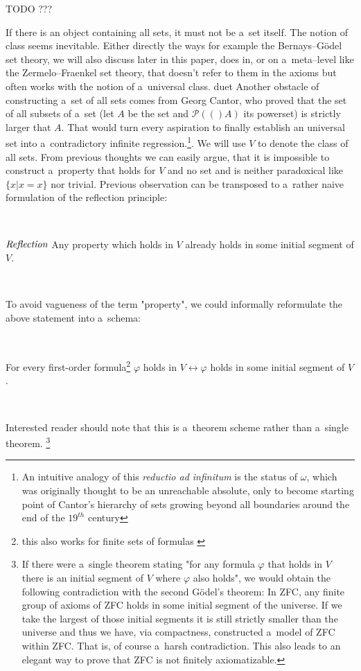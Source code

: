 \documentclass[12pt,a4paper]{article}
\newcommand{\power}[1]{\ensuremath{\mathscr{P}} (#1)}
\renewcommand{\iff}{\leftrightarrow}
\begin{document}
TODO ???

If there is an object containing all sets, it must not be a~set itself. The notion of class seems inevitable. Either directly the ways for example the Bernays–Gödel set theory, we will also discuss later in this paper, does in, or on a~meta–level like the Zermelo–Fraenkel set theory, that doesn't refer to them in the axioms but often works with the notion of a~universal class.
duet
Another obstacle of constructing a~set of all sets comes from Georg Cantor, who proved that the set of all subsets of a~set (let $A$ be the set and $\power (A)$ its powerset) is strictly larger that $A$. That would turn every aspiration to finally establish an universal set into a~contradictory infinite regression.\footnote{An intuitive analogy of this \emph{reductio ad infinitum} is the status of $\omega$, which was originally thought to be an unreachable absolute, only to become starting point of Cantor's hierarchy of sets growing beyond all boundaries around the end of the $19^{th}$ century}. We will use $V$ to denote the class of all sets. %
From previous thoughts we can easily argue, that it is impossible to construct a~property that holds for $V$ and no set and is neither paradoxical like $\{x  |  x = x\}$ nor trivial. Previous observation can be transposed to a~rather naive formulation of the reflection principle:


\

$\emph{Reflection}$ Any property which holds in $V$ already holds in some initial segment of $V$. 

\

To avoid vagueness of the term "property", we could informally reformulate the above statement into a~schema: 

\

For every first-order formula\footnote{this also works for finite sets of formulas \cite[p.~168]{JechBook}} $\varphi$ holds in $V \iff \varphi$ holds in some initial segment of $V$.

\

Interested reader should note that this is a~theorem scheme rather than a~single theorem. \footnote{If there were a~single theorem stating "for any formula $\varphi$ that holds in $V$ there is an initial segment of $V$ where $\varphi$ also holds", we would obtain the following contradiction with the second G{\"o}del's theorem: In ZFC, any finite group of axioms of ZFC holds in some initial segment of the universe. If we take the largest of those initial segments it is still strictly smaller than the universe and thus we have, via compactness, constructed a~model of ZFC within ZFC. That is, of course a~harsh contradiction. This also leads to an elegant way to prove that ZFC is not finitely axiomatizable.}
\end{document}

